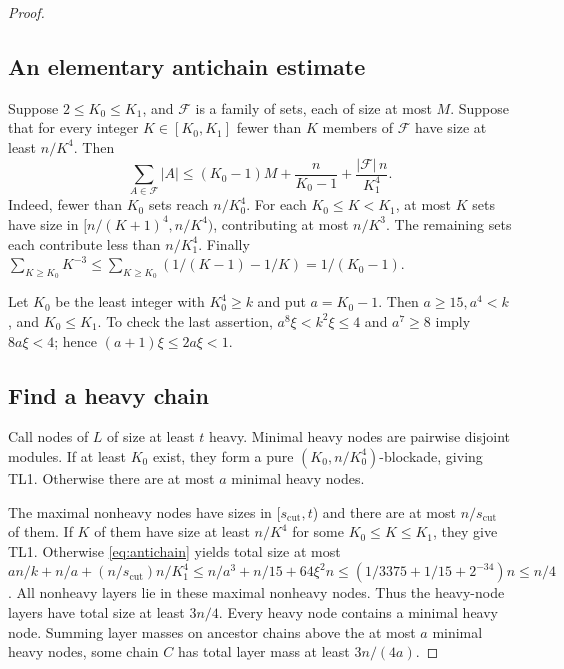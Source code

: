 \documentclass[11pt,a4paper]{article}
\theoremstyle{definition}
\theoremstyle{remark}
\numberwithin{equation}{section}
\begin{document}
\begin{proof}
\subsection{An elementary antichain estimate}
Suppose \(2\le K_{0}\le K_{1}\), and \(\mathcal F\) is a family of sets, each of size at most \(M\). Suppose that for every integer \(K\in[K_{0},K_{1}]\) fewer than \(K\) members of \(\mathcal F\) have size at least \(n/K^{4}\). Then
\begin{equation}\label{eq:antichain}
 \sum_{A\in\mathcal F}|A|\le (K_{0}-1)M+\frac{n}{K_{0}-1}+\frac{|\mathcal F|\,n}{K_{1}^{4}}.
\end{equation}
Indeed, fewer than \(K_{0}\) sets reach \(n/K_{0}^{4}\). For each \(K_{0}\le K<K_{1}\), at most \(K\) sets have size in \([n/(K+1)^{4},n/K^{4})\), contributing at most \(n/K^{3}\). The remaining sets each contribute less than \(n/K_{1}^{4}\). Finally \(\sum _{K\ge K_{0}}K^{-3}\le \sum _{K\ge K_{0}}(1/(K-1)-1/K)=1/(K_{0}-1)\).

Let \(K_{0}\) be the least integer with \(K_{0}^{4}\ge\allowbreak k\) and put \(a=K_{0}-1\). Then \(a\ge\allowbreak 15,\allowbreak  a^{4}<k\), and \(K_{0}\le\allowbreak K_{1}\). To check the last assertion, \(a^{8} \xi<k^{2} \xi\le\allowbreak 4\) and \(a^{7}\ge\allowbreak 8\) imply \(8a \xi<4\); hence \((a+1)\xi\le\allowbreak 2a \xi<1\).
\subsection{Find a heavy chain}
Call nodes of \(L\) of size at least \(t\) heavy. Minimal heavy nodes are pairwise disjoint modules. If at least \(K_{0}\) exist, they form a pure \((K_{0},\allowbreak n/K_{0}^{4})\)-blockade, giving TL1. Otherwise there are at most \(a\) minimal heavy nodes.

The maximal nonheavy nodes have sizes in [\(s_{\mathrm{cut}},\allowbreak t\)) and there are at most \(n/s_{\mathrm{cut}}\) of them. If \(K\) of them have size at least \(n/K^{4}\) for some \(K_{0}\le\allowbreak K\le\allowbreak K_{1}\), they give TL1. Otherwise \eqref{eq:antichain} yields total size at most \(an/k+n/a+(n/s_{\mathrm{cut}})n/K_{1}^{4} \le\allowbreak n/a^{3}+n/15+64\xi^{2} n \le\allowbreak (1/3375+1/15+2^{-34})n\le\allowbreak n/4\). All nonheavy layers lie in these maximal nonheavy nodes. Thus the heavy-node layers have total size at least \(3n/4\). Every heavy node contains a minimal heavy node. Summing layer masses on ancestor chains above the at most \(a\) minimal heavy nodes, some chain \(C\) has total layer mass at least \(3n/(4a)\).

\end{proof}
\end{document}
